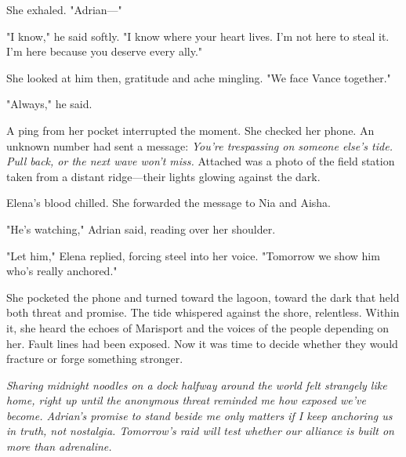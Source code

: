 She exhaled. "Adrian—"

"I know," he said softly. "I know where your heart lives. I'm not here to steal it. I'm here because you deserve every ally."

She looked at him then, gratitude and ache mingling. "We face Vance together."

"Always," he said.

A ping from her pocket interrupted the moment. She checked her phone. An unknown number had sent a message: \textit{You're trespassing on someone else's tide. Pull back, or the next wave won't miss.} Attached was a photo of the field station taken from a distant ridge—their lights glowing against the dark.

Elena's blood chilled. She forwarded the message to Nia and Aisha.

"He's watching," Adrian said, reading over her shoulder.

"Let him," Elena replied, forcing steel into her voice. "Tomorrow we show him who's really anchored."

She pocketed the phone and turned toward the lagoon, toward the dark that held both threat and promise. The tide whispered against the shore, relentless. Within it, she heard the echoes of Marisport and the voices of the people depending on her. Fault lines had been exposed. Now it was time to decide whether they would fracture or forge something stronger.


\noindent\textit{Sharing midnight noodles on a dock halfway around the world felt strangely like home, right up until the anonymous threat reminded me how exposed we've become. Adrian's promise to stand beside me only matters if I keep anchoring us in truth, not nostalgia. Tomorrow's raid will test whether our alliance is built on more than adrenaline.}

